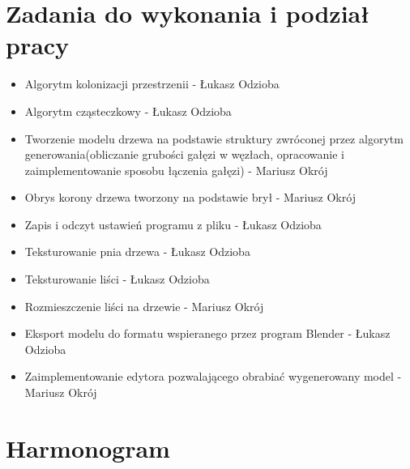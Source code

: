 \section{Zadania do wykonania i podział pracy}
\begin{itemize}
	\item{Algorytm kolonizacji przestrzenii - Łukasz Odzioba}
	\item{Algorytm cząsteczkowy - Łukasz Odzioba}
	\item{Tworzenie modelu drzewa na podstawie struktury zwróconej przez algorytm generowania(obliczanie grubości gałęzi w węzłach, opracowanie i zaimplementowanie sposobu łączenia gałęzi) - Mariusz Okrój}
	\item{Obrys korony drzewa tworzony na podstawie brył - Mariusz Okrój}
	\item{Zapis i odczyt ustawień programu z pliku - Łukasz Odzioba}
	\item{Teksturowanie pnia drzewa - Łukasz Odzioba}
	\item{Teksturowanie liści - Łukasz Odzioba}
	\item{Rozmieszczenie liści na drzewie - Mariusz Okrój}
	\item{Eksport modelu do formatu wspieranego przez program Blender - Łukasz Odzioba}
	\item{Zaimplementowanie edytora pozwalającego obrabiać wygenerowany model - Mariusz Okrój}
\end{itemize}


\section{Harmonogram}


